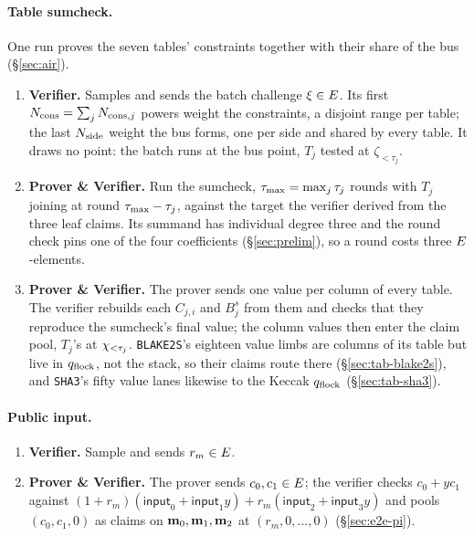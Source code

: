 \paragraph{Table sumcheck.} One run proves the seven tables' constraints together with their share of the bus (\S\ref{sec:air}).
\begin{enumerate}
\item \textbf{Verifier.} Samples and sends the batch challenge $\xi\in E$. Its first $N_{\mathrm{cons}}=\sum_jN_{\mathrm{cons},j}$ powers weight the constraints, a disjoint range per table; the last $N_{\mathrm{side}}$ weight the bus forms, one per side and shared by every table. It draws no point: the batch runs at the bus point, $T_j$ tested at $\zeta_{<\tau_j}$.
\item \textbf{Prover \& Verifier.} Run the sumcheck, $\tau_{\max}=\max_j\tau_j$ rounds with $T_j$ joining at round $\tau_{\max}-\tau_j$, against the target the verifier derived from the three leaf claims. Its summand has individual degree three and the round check pins one of the four coefficients (\S\ref{sec:prelim}), so a round costs three $E$-elements.
\item \textbf{Prover \& Verifier.} The prover sends one value per column of every table. The verifier rebuilds each $C_{j,i}$ and $B^{s}_j$ from them and checks that they reproduce the sumcheck's final value; the column values then enter the claim pool, $T_j$'s at $\chi_{<\tau_j}$. \texttt{BLAKE2S}'s eighteen value limbs are columns of its table but live in $q_{\mathrm{flock}}$, not the stack, so their claims route there (\S\ref{sec:tab-blake2s}), and \texttt{SHA3}'s fifty value lanes likewise to the Keccak $q_{\mathrm{flock}}$ (\S\ref{sec:tab-sha3}).
\end{enumerate}

\paragraph{Public input.}

\begin{enumerate}
\item \textbf{Verifier.} Sample and sends $r_m\in E$.
\item \textbf{Prover \& Verifier.} The prover sends $c_0,c_1 \in E$; the verifier checks $c_0+y c_1$ against $(1+r_m)(\textsf{input}_0+\textsf{input}_1y)+r_m(\textsf{input}_2+\textsf{input}_3y)$ and pools $(c_0,c_1,0)$ as claims on $\mathbf{m}_0,\mathbf{m}_1,\mathbf{m}_2$ at $(r_m,0,\dots,0)$ (\S\ref{sec:e2e-pi}).
\end{enumerate}

